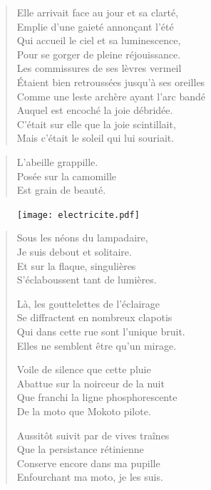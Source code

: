 \begin{verse}
Elle arrivait face au jour et sa clarté,\\
Emplie d’une gaieté annonçant l’été\\
Qui accueil le ciel et sa luminescence,\\
Pour se gorger de pleine réjouissance.\\
Les commissures de ses lèvres vermeil\\
Étaient bien retroussées jusqu’à ses oreilles\\
Comme une leste archère ayant l’arc bandé\\
Auquel est encoché la joie débridée.\\
C’était sur elle que la joie scintillait,\\
Mais c’était le soleil qui lui souriait.
\end{verse}

\begin{verse}
L’abeille grappille.\\
Posée sur la camomille\\
Est grain de beauté.
\end{verse}

\begin{figure}[h]
\centering
\texttt{[image: electricite.pdf]}
\captionsetup{labelformat=empty}
\caption[Idéotexte de l’]{}
\end{figure}

\begin{verse}
Sous les néons du lampadaire,\\
Je suis debout et solitaire.\\
Et sur la flaque, singulières\\
S’éclaboussent tant de lumières.

Là, les gouttelettes de l’éclairage\\
Se diffractent en nombreux clapotis \\
Qui dans cette rue sont l’unique bruit.\\
Elles ne semblent être qu’un mirage.

Voile de silence que cette pluie\\
Abattue sur la noirceur de la nuit\\
Que franchi la ligne phosphorescente\\
De la moto que Mokoto pilote.

Aussitôt suivit par de vives traînes\\
Que la persistance rétinienne\\
Conserve encore dans ma pupille\\
Enfourchant ma moto, je les suis.
\end{verse}



